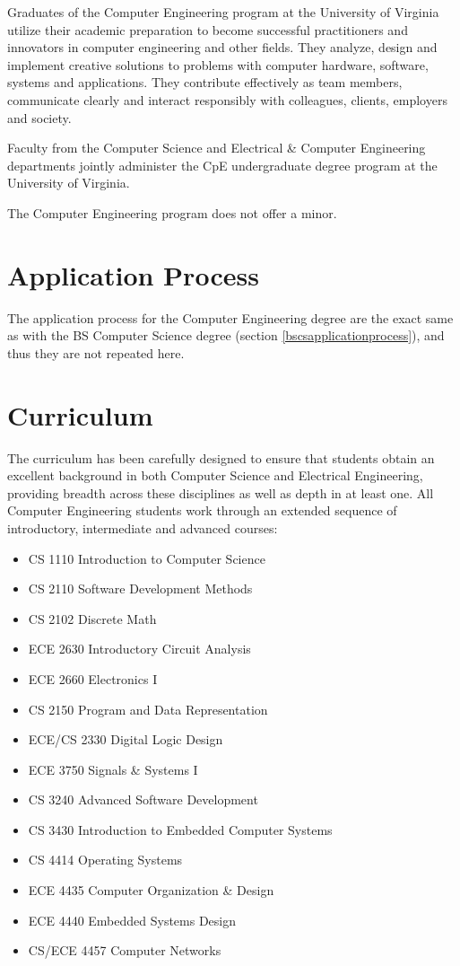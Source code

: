 \documentclass[10pt,letter]{book}
\newenvironment{itemlist}{
\begin{itemize}
\setlength{\itemsep}{0pt}
\setlength{\parskip}{0pt}}
{\end{itemize}}
\newcommand{\mysection}[1]{\section{#1}\renewcommand{\rightmark}{#1}}
\begin{document}
Graduates of the Computer Engineering program at the
University of Virginia utilize their academic preparation
to become successful practitioners and innovators in
computer engineering and other fields. They analyze,
design and implement creative solutions to problems
with computer hardware, software, systems and
applications. They contribute effectively as team
members, communicate clearly and interact responsibly
with colleagues, clients, employers and society.

Faculty from the Computer Science and Electrical \& Computer
Engineering departments jointly administer the CpE undergraduate
degree program at the University of Virginia.

The Computer Engineering program does not offer a minor.


\mysection{Application Process}
\label{bscpeapplicationprocess}

The application process for the Computer Engineering degree are the
exact same as with the BS Computer Science degree (section
\ref{bscsapplicationprocess}), and thus they are not repeated here.


\mysection{Curriculum} %

The curriculum has been carefully designed to ensure that students
obtain an excellent background in both Computer Science and Electrical
Engineering, providing breadth across these disciplines as well as
depth in at least one. All Computer Engineering students work through
an extended sequence of introductory, intermediate and advanced
courses:

\begin{itemlist}
\item CS 1110 Introduction to Computer Science
\item CS 2110 Software Development Methods
\item CS 2102 Discrete Math
\item ECE 2630 Introductory Circuit Analysis
\item ECE 2660 Electronics I
\item CS 2150 Program and Data Representation
\item ECE/CS 2330 Digital Logic Design
\item ECE 3750 Signals \& Systems I
\item CS 3240 Advanced Software Development
\item CS 3430 Introduction to Embedded Computer Systems
\item CS 4414 Operating Systems
\item ECE 4435 Computer Organization \& Design
\item ECE 4440 Embedded Systems Design
\item CS/ECE 4457 Computer Networks
\end{itemlist}
\end{document}
